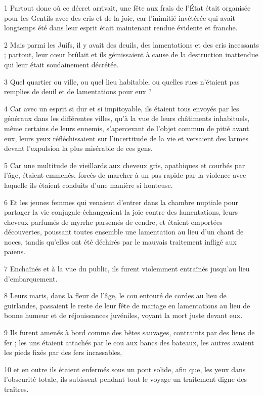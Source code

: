 \par 1 Partout donc où ce décret arrivait, une fête aux frais de l'État était organisée pour les Gentils avec des cris et de la joie, car l'inimitié invétérée qui avait longtemps été dans leur esprit était maintenant rendue évidente et franche.
\par 2 Mais parmi les Juifs, il y avait des deuils, des lamentations et des cris incessants ; partout, leur cœur brûlait et ils gémissaient à cause de la destruction inattendue qui leur était soudainement décrétée.
\par 3 Quel quartier ou ville, ou quel lieu habitable, ou quelles rues n'étaient pas remplies de deuil et de lamentations pour eux ?
\par 4 Car avec un esprit si dur et si impitoyable, ils étaient tous envoyés par les généraux dans les différentes villes, qu'à la vue de leurs châtiments inhabituels, même certains de leurs ennemis, s'apercevant de l'objet commun de pitié avant eux, leurs yeux réfléchissaient sur l'incertitude de la vie et versaient des larmes devant l'expulsion la plus misérable de ces gens.
\par 5 Car une multitude de vieillards aux cheveux gris, apathiques et courbés par l'âge, étaient emmenés, forcés de marcher à un pas rapide par la violence avec laquelle ils étaient conduits d'une manière si honteuse.
\par 6 Et les jeunes femmes qui venaient d'entrer dans la chambre nuptiale pour partager la vie conjugale échangeaient la joie contre des lamentations, leurs cheveux parfumés de myrrhe parsemés de cendre, et étaient emportées découvertes, poussant toutes ensemble une lamentation au lieu d'un chant de noces, tandis qu'elles ont été déchirés par le mauvais traitement infligé aux païens.
\par 7 Enchaînés et à la vue du public, ils furent violemment entraînés jusqu'au lieu d'embarquement.
\par 8 Leurs maris, dans la fleur de l'âge, le cou entouré de cordes au lieu de guirlandes, passaient le reste de leur fête de mariage en lamentations au lieu de bonne humeur et de réjouissances juvéniles, voyant la mort juste devant eux.
\par 9 Ils furent amenés à bord comme des bêtes sauvages, contraints par des liens de fer ; les uns étaient attachés par le cou aux bancs des bateaux, les autres avaient les pieds fixés par des fers incassables,
\par 10 et en outre ils étaient enfermés sous un pont solide, afin que, les yeux dans l'obscurité totale, ils subissent pendant tout le voyage un traitement digne des traîtres.
